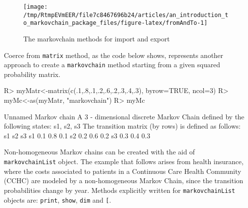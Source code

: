 \documentclass[
  nojss]{jss}
\begin{document}
\begin{CodeChunk}
\begin{figure}

{\centering \texttt{[image: /tmp/RtmpEVmEER/file7c8467696b24/articles/an\_introduction\_to\_markovchain\_package\_files/figure-latex/fromAndTo-1]} 

}

\caption[The markovchain methods for import and export]{The markovchain methods for import and export}\label{fig:fromAndTo}
\end{figure}
\end{CodeChunk}

Coerce from \texttt{matrix} method, as the code below shows, represents another approach to create a \texttt{markovchain} method starting from a given squared probability matrix.

\begin{CodeChunk}

\begin{CodeInput}
R> myMatr<-matrix(c(.1,.8,.1,.2,.6,.2,.3,.4,.3), byrow=TRUE, ncol=3)
R> myMc<-as(myMatr, "markovchain")
R> myMc
\end{CodeInput}

\begin{CodeOutput}
Unnamed Markov chain 
 A  3 - dimensional discrete Markov Chain defined by the following states: 
 s1, s2, s3 
 The transition matrix  (by rows)  is defined as follows: 
    s1  s2  s3
s1 0.1 0.8 0.1
s2 0.2 0.6 0.2
s3 0.3 0.4 0.3
\end{CodeOutput}
\end{CodeChunk}

Non-homogeneous Markov chains can be created with the aid of \texttt{markovchainList} object. The example that follows arises from health insurance, where the costs associated to patients in a Continuous Care Health Community (CCHC) are modeled by a non-homogeneous Markov Chain, since the transition probabilities change by year. Methods explicitly written for \texttt{markovchainList} objects are: \texttt{print}, \texttt{show}, \texttt{dim} and \texttt{{[}}.
\end{document}
